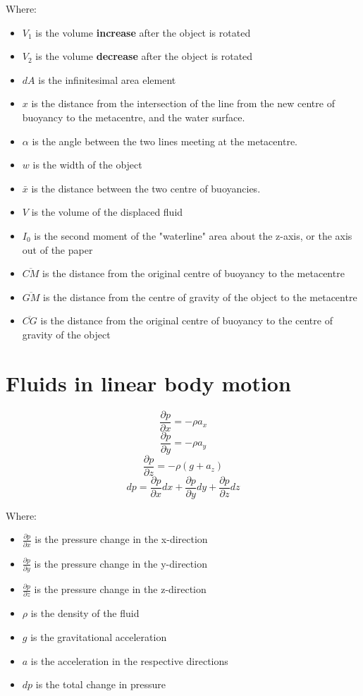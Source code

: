 \documentclass[11pt]{article}
\begin{document}
Where:
\begin{itemize}
\item \(V_1\) is the volume \textbf{increase} after the object is rotated
\item \(V_2\) is the volume \textbf{decrease} after the object is rotated
\item \(dA\) is the infinitesimal area element
\item \(x\) is the distance from the intersection of the line from the new centre of buoyancy to the metacentre, and the water surface.
\item \(\alpha\) is the angle between the two lines meeting at the metacentre.
\item \(w\) is the width of the object
\item \(\bar{x}\) is the distance between the two centre of buoyancies.
\item \(V\) is the volume of the displaced fluid
\item \(I_0\) is the second moment of the "waterline" area about the z-axis, or the axis out of the paper
\item \(\overline{CM}\) is the distance from the original centre of buoyancy to the metacentre
\item \(\overline{GM}\) is the distance from the centre of gravity of the object to the metacentre
\item \(\overline{CG}\) is the distance from the original centre of buoyancy to the centre of gravity of the object
\end{itemize}
\section{Fluids in linear body motion}
\label{sec:org22902a0}
\[\frac{\partial p}{\partial x} = - \rho a_x\]
\[\frac{\partial p}{\partial y} = - \rho a_y\]
\[\frac{\partial p}{\partial z} = - \rho (g + a_z)\]
\[dp = \frac{\partial p}{\partial x} dx + \frac{\partial p}{\partial y} dy + \frac{\partial p}{\partial z} dz\]

Where:
\begin{itemize}
\item \(\frac{\partial p}{\partial x}\) is the pressure change in the x-direction
\item \(\frac{\partial p}{\partial y}\) is the pressure change in the y-direction
\item \(\frac{\partial p}{\partial z}\) is the pressure change in the z-direction
\item \(\rho\) is the density of the fluid
\item \(g\) is the gravitational acceleration
\item \(a\) is the acceleration in the respective directions
\item \(dp\) is the total change in pressure
\end{itemize}
\end{document}

